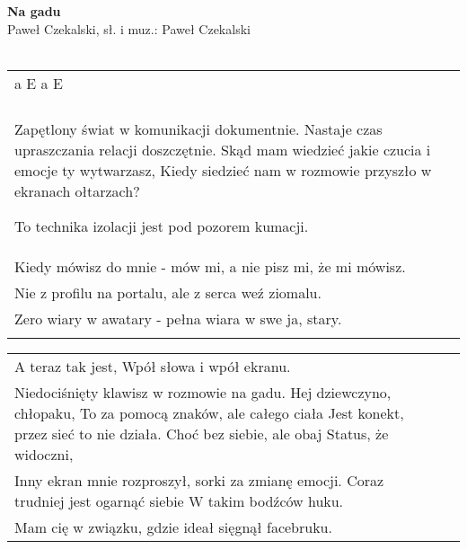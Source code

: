 \documentclass[a5paper]{article}
\begin{document}


\noindent
\fontsize{12pt}{15pt}\selectfont
\textbf{Na gadu} \\
\fontsize{8pt}{10pt}\selectfont
Paweł Czekalski, sł. i muz.: Paweł Czekalski \\ \\
\fontsize{10pt}{12pt}\selectfont
{}
\begin{tabular}{@{}p{12cm}p{3cm}@{}}
\noindent
a E a E \\ \\
Zapętlony świat w komunikacji dokumentnie. %
Nastaje czas upraszczania relacji doszczętnie. %
Skąd mam wiedzieć jakie czucia i emocje ty wytwarzasz, %
Kiedy siedzieć nam w rozmowie przyszło w ekranach ołtarzach? %

To technika izolacji jest pod pozorem kumacji. \\
Kiedy mówisz do mnie - mów mi, a nie pisz mi, że mi mówisz. \\
Nie z profilu na portalu, ale z serca weź ziomalu. \\
Zero wiary w awatary - pełna wiara w swe ja, stary. \\ \\
\end{tabular}

\noindent
\begin{tabular}{@{}p{12cm}p{3cm}@{}}
A teraz tak jest, %
Wpół słowa i wpół ekranu. \\
Niedociśnięty klawisz w rozmowie na gadu. %
Hej dziewczyno, chłopaku, %
To za pomocą znaków, ale całego ciała %
Jest konekt, przez sieć to nie działa. %
Choć bez siebie, ale obaj %
Status, że widoczni, \\
Inny ekran mnie rozproszył, sorki za zmianę emocji. %
Coraz trudniej jest ogarnąć siebie %
W takim bodźców huku. \\
Mam cię w związku, gdzie ideał sięgnął facebruku. %
\end{tabular}
\end{document}
